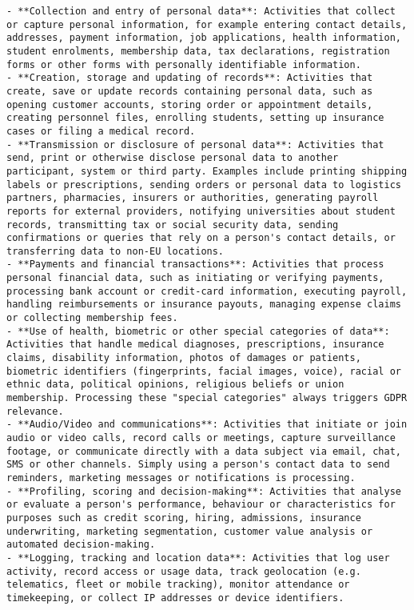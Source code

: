 \begin{lstlisting}[caption={System-Prompt der DSGVO-Klassifikation von BPMN-Aktivitäten},label={lst:system-prompt}]
- **Collection and entry of personal data**: Activities that collect or capture personal information, for example entering contact details, addresses, payment information, job applications, health information, student enrolments, membership data, tax declarations, registration forms or other forms with personally identifiable information.
- **Creation, storage and updating of records**: Activities that create, save or update records containing personal data, such as opening customer accounts, storing order or appointment details, creating personnel files, enrolling students, setting up insurance cases or filing a medical record.
- **Transmission or disclosure of personal data**: Activities that send, print or otherwise disclose personal data to another participant, system or third party. Examples include printing shipping labels or prescriptions, sending orders or personal data to logistics partners, pharmacies, insurers or authorities, generating payroll reports for external providers, notifying universities about student records, transmitting tax or social security data, sending confirmations or queries that rely on a person's contact details, or transferring data to non-EU locations.
- **Payments and financial transactions**: Activities that process personal financial data, such as initiating or verifying payments, processing bank account or credit-card information, executing payroll, handling reimbursements or insurance payouts, managing expense claims or collecting membership fees.
- **Use of health, biometric or other special categories of data**: Activities that handle medical diagnoses, prescriptions, insurance claims, disability information, photos of damages or patients, biometric identifiers (fingerprints, facial images, voice), racial or ethnic data, political opinions, religious beliefs or union membership. Processing these "special categories" always triggers GDPR relevance.
- **Audio/Video and communications**: Activities that initiate or join audio or video calls, record calls or meetings, capture surveillance footage, or communicate directly with a data subject via email, chat, SMS or other channels. Simply using a person's contact data to send reminders, marketing messages or notifications is processing.
- **Profiling, scoring and decision-making**: Activities that analyse or evaluate a person's performance, behaviour or characteristics for purposes such as credit scoring, hiring, admissions, insurance underwriting, marketing segmentation, customer value analysis or automated decision-making.
- **Logging, tracking and location data**: Activities that log user activity, record access or usage data, track geolocation (e.g. telematics, fleet or mobile tracking), monitor attendance or timekeeping, or collect IP addresses or device identifiers.

\end{lstlisting}
